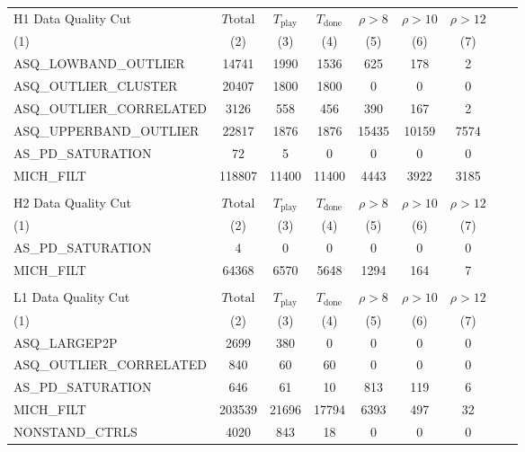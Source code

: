 \begin{table}[p]
\begin{center}
\begin{tabular}{lcccccccc}
H1 Data Quality Cut      &$T\mathrm{total}$&$T_\mathrm{play}$&$T_\mathrm{done}$&$\rho>8$&$\rho>10$&$\rho>12$ \\
(1)                      &(2)     &(3)    &(4)    &(5)     &(6)     &(7)\\\hline
ASQ\_LOWBAND\_OUTLIER    &  14741 &  1990 &  1536 &   625  &  178   &   2 \\
ASQ\_OUTLIER\_CLUSTER    &  20407 &  1800 &  1800 &     0  &    0   &   0 \\
ASQ\_OUTLIER\_CORRELATED &   3126 &   558 &   456 &   390  &  167   &   2 \\
ASQ\_UPPERBAND\_OUTLIER  &  22817 &  1876 &  1876 & 15435  &10159   &7574 \\
AS\_PD\_SATURATION       &     72 &     5 &     0 &     0  &    0   &   0 \\
MICH\_FILT               & 118807 & 11400 & 11400 &  4443  & 3922   &3185 \\
\hline\hline
\\
H2 Data Quality Cut      &$T\mathrm{total}$&$T_\mathrm{play}$&$T_\mathrm{done}$&$\rho>8$&$\rho>10$&$\rho>12$ \\
(1)                      &(2)     &(3)    &(4)    &(5)     &(6)     &(7)  \\\hline
AS\_PD\_SATURATION        &    4   &   0   &   0  &    0  &    0   &   0 \\
MICH\_FILT                &64368   &6570   &5648  & 1294  &  164   &   7 \\
\hline\hline
\\
L1 Data Quality Cut      &$T\mathrm{total}$&$T_\mathrm{play}$&$T_\mathrm{done}$&$\rho>8$&$\rho>10$&$\rho>12$ \\
(1)                      &(2)     &(3)    &(4)    &(5)     &(6)     &(7)  \\\hline
ASQ\_LARGEP2P            &   2699 &   380 &     0  &    0 &    0  &    0 \\
ASQ\_OUTLIER\_CORRELATED &    840 &    60 &    60  &    0 &    0  &    0 \\
AS\_PD\_SATURATION       &    646 &    61 &    10  &  813 &  119  &    6 \\
MICH\_FILT               & 203539 & 21696 & 17794  & 6393 &  497  &   32 \\
NONSTAND\_CTRLS          &   4020 &   843 &    18  &    0 &    0  &    0 \\

\end{tabular}
\end{center}
\end{table}
